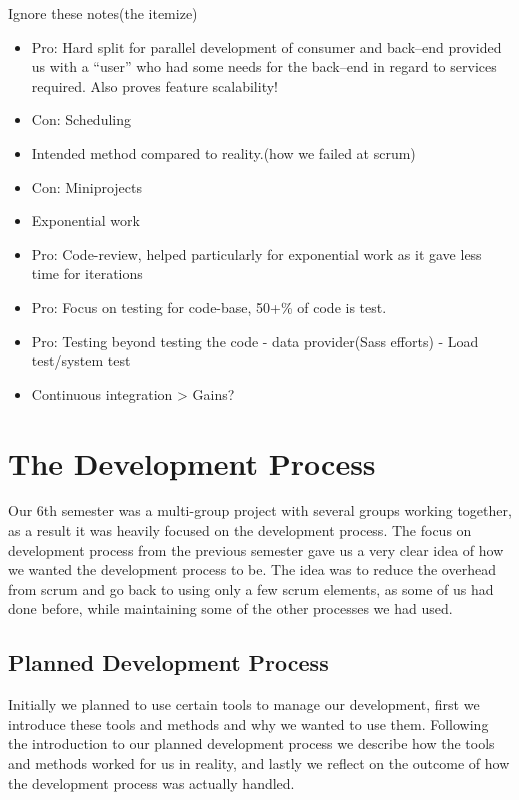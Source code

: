 Ignore these notes(the itemize)
\begin{itemize}
    \item Pro: Hard split for parallel development of consumer and back--end provided us with a ``user'' who had some needs for the back--end in regard to services required. Also proves feature scalability!
    \item Con: Scheduling
    \item Intended method compared to reality.(how we failed at scrum)
    \item Con: Miniprojects
    \item Exponential work
    \item Pro: Code-review, helped particularly for exponential work as it gave less time for iterations
    \item Pro: Focus on testing for code-base, 50+\% of code is test.
    \item Pro: Testing beyond testing the code -  data provider(Sass efforts) - Load test/system test
    \item Continuous integration > Gains?
\end{itemize}

\section{The Development Process}
Our 6th semester was a multi-group project with several groups working together, as a result it was heavily focused on the development process.
The focus on development process from the previous semester gave us a very clear idea of how we wanted the development process to be.
The idea was to reduce the overhead from scrum and go back to using only a few scrum elements, as some of us had done before, while maintaining some of the other processes we had used.
\subsection{Planned Development Process}
Initially we planned to use certain tools to manage our development, first we introduce these tools and methods and why we wanted to use them.
Following the introduction to our planned development process we describe how the tools and methods worked for us in reality, and lastly we reflect on the outcome of how the development process was actually handled.
